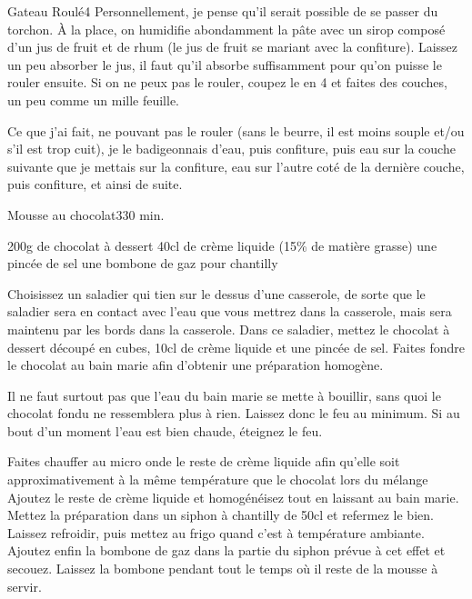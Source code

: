 \begin{recette}{Gateau Roulé}{4}{}{}
Personnellement, je pense qu'il serait possible de se passer du torchon. À la place, on humidifie abondamment la pâte avec un sirop composé d'un jus de fruit et de rhum (le jus de fruit se mariant avec la confiture). Laissez un peu absorber le jus, il faut qu'il absorbe suffisamment pour qu'on puisse le rouler ensuite. Si on ne peux pas le rouler, coupez le en 4 et faites des couches, un peu comme un mille feuille.

Ce que j'ai fait, ne pouvant pas le rouler (sans le beurre, il est moins souple et/ou s'il est trop cuit), je le badigeonnais d'eau, puis confiture, puis eau sur la couche suivante que je mettais sur la confiture, eau sur l'autre coté de la dernière couche, puis confiture, et ainsi de suite.

\end{recette}

\begin{recette}{Mousse au chocolat}{3}{30 min.}{}
\begin{ingredients}
\ingredient 200g de chocolat à dessert
\ingredient 40cl de crème liquide (15\% de matière grasse)
\ingredient une pincée de sel
\ingredient une bombone de gaz pour chantilly
\end{ingredients}

\begin{preparation}
\etape Choisissez un saladier qui tien sur le dessus d'une casserole, de sorte que le saladier sera en contact avec l'eau que vous mettrez dans la casserole, mais sera maintenu par les bords dans la casserole.
\etape Dans ce saladier, mettez le chocolat à dessert découpé en cubes, 10cl de crème liquide et une pincée de sel. Faites fondre le chocolat au bain marie afin d'obtenir une préparation homogène.
\begin{attention}
Il ne faut surtout pas que l'eau du bain marie se mette à bouillir, sans quoi le chocolat fondu ne ressemblera plus à rien. Laissez donc le feu au minimum. Si au bout d'un moment l'eau est bien chaude, éteignez le feu.
\end{attention}

\etape Faites chauffer au micro onde le reste de crème liquide afin qu'elle soit approximativement à la même température que le chocolat lors du mélange
\etape Ajoutez le reste de crème liquide et homogénéisez tout en laissant au bain marie.
\etape Mettez la préparation dans un siphon à chantilly de 50cl et refermez le bien. Laissez refroidir, puis mettez au frigo quand c'est à température ambiante.
\etape Ajoutez enfin la bombone de gaz dans la partie du siphon prévue à cet effet et secouez. Laissez la bombone pendant tout le temps où il reste de la mousse à servir. 
\end{preparation}
\end{recette}


